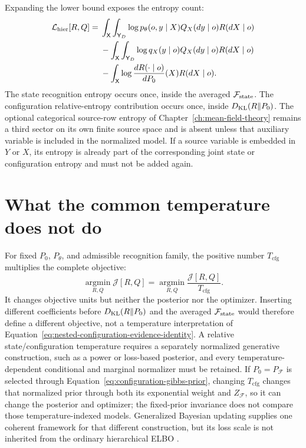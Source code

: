 Expanding the lower bound exposes the entropy count:
\begin{align}
\mathcal L_{\mathrm{hier}}[R,Q]
={}&\int_{\mathsf X}\int_{\mathsf Y_D}
\log p_\theta(o,y\mid X)Q_X(dy\mid o)R(dX\mid o)
\notag\\
&-\int_{\mathsf X}\int_{\mathsf Y_D}
\log q_X(y\mid o)Q_X(dy\mid o)R(dX\mid o)
\label{eq:hierarchical-elbo-entropy-audit}\\
&-\int_{\mathsf X}
\log\frac{dR(\mathord\cdot\mid o)}{dP_0}(X)R(dX\mid o).
\notag
\end{align}
The state recognition entropy occurs once, inside the averaged \(\mathcal F_{\mathrm{state}}\). The configuration relative-entropy contribution occurs once, inside \(D_{\mathrm{KL}}(R\Vert P_0)\). The optional categorical source-row entropy of Chapter~\ref{ch:mean-field-theory} remains a third sector on its own finite source space and is absent unless that auxiliary variable is included in the normalized model. If a source variable is embedded in \(Y\) or \(X\), its entropy is already part of the corresponding joint state or configuration entropy and must not be added again.

\section{What the common temperature does not do}

For fixed \(P_0\), \(P_\theta\), and admissible recognition family, the positive number \(T_{\mathrm{cfg}}\) multiplies the complete objective:
\begin{equation}
\operatorname*{argmin}_{R,Q}\mathcal J[R,Q]
=\operatorname*{argmin}_{R,Q}
\frac{\mathcal J[R,Q]}{T_{\mathrm{cfg}}}.
\label{eq:common-temperature-optimizer-invariance}
\end{equation}
It changes objective units but neither the posterior nor the optimizer. Inserting different coefficients before \(D_{\mathrm{KL}}(R\Vert P_0)\) and the averaged \(\mathcal F_{\mathrm{state}}\) would therefore define a different objective, not a temperature interpretation of Equation~\eqref{eq:nested-configuration-evidence-identity}. A relative state/configuration temperature requires a separately normalized generative construction, such as a power or loss-based posterior, and every temperature-dependent conditional and marginal normalizer must be retained. If \(P_0=P_{\mathcal F}\) is selected through Equation~\eqref{eq:configuration-gibbs-prior}, changing \(T_{\mathrm{cfg}}\) changes that normalized prior through both its exponential weight and \(Z_{\mathcal F}\), so it can change the posterior and optimizer; the fixed-prior invariance does not compare those temperature-indexed models. Generalized Bayesian updating supplies one coherent framework for that different construction, but its loss scale is not inherited from the ordinary hierarchical ELBO \citep{BissiriHolmesWalker2016}.

